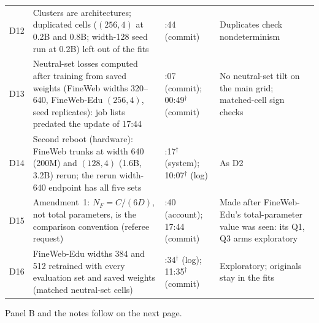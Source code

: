 \begin{table}[p]
\begin{tabular}{@{}>{\raggedright\arraybackslash}p{}>{\raggedright\arraybackslash}p{}>{\raggedright\arraybackslash}p{}>{\raggedright\arraybackslash}p{}@{}}
D12 & Clusters are architectures; duplicated cells ($(256,4)$ at 0.2B and 0.8B; width-128 seed run at 0.2B) left out of the fits & 17:44 (commit) & Duplicates check nondeterminism \\
D13 & Neutral-set losses computed after training from saved weights (FineWeb widths 320--640, FineWeb-Edu $(256,4)$, seed replicates): job lists predated the update of 17:44 & 23:07 (commit); 00:49$^{\dagger}$ (commit) & No neutral-set tilt on the main grid; matched-cell sign checks \\
D14 & Second reboot (hardware): FineWeb trunks at width 640 (200M) and $(128,4)$ (1.6B, 3.2B) rerun; the rerun width-640 endpoint has all five sets & 03:17$^{\dagger}$ (system); 10:07$^{\dagger}$ (log) & As D2 \\
D15 & Amendment~1: $N_F=C/(6D)$, not total parameters, is the comparison convention (referee request) & 17:40 (account); 17:44 (commit) & Made after FineWeb-Edu's total-parameter value was seen: its Q1, Q3 arms exploratory \\
D16 & FineWeb-Edu widths 384 and 512 retrained with every evaluation set and saved weights (matched neutral-set cells) & 11:34$^{\dagger}$ (log); 11:35$^{\dagger}$ (commit) & Exploratory; originals stay in the fits \\
\bottomrule
\end{tabular}
\begin{tablenotes}
Panel B and the notes follow on the next page.
\end{tablenotes}
\end{table}

